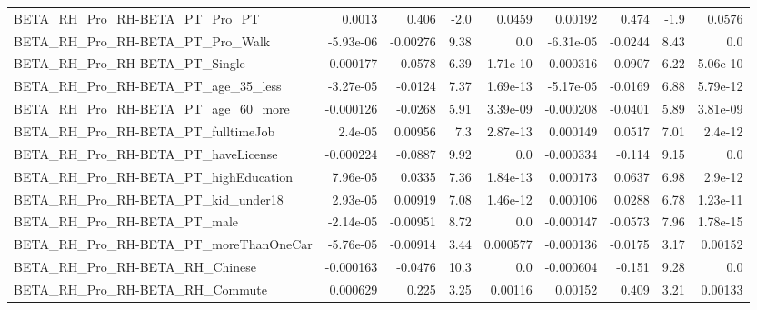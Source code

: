 \begin{tabular}{lrrrrrrrr}
BETA\_RH\_Pro\_RH-BETA\_PT\_Pro\_PT                      &      0.0013 &        0.406 &      -2.0 &   0.0459 &    0.00192 &       0.474 &         -1.9 &        0.0576 \\
BETA\_RH\_Pro\_RH-BETA\_PT\_Pro\_Walk                    &   -5.93e-06 &     -0.00276 &      9.38 &      0.0 &  -6.31e-05 &     -0.0244 &         8.43 &           0.0 \\
BETA\_RH\_Pro\_RH-BETA\_PT\_Single                      &    0.000177 &       0.0578 &      6.39 & 1.71e-10 &   0.000316 &      0.0907 &         6.22 &      5.06e-10 \\
BETA\_RH\_Pro\_RH-BETA\_PT\_age\_35\_less                 &   -3.27e-05 &      -0.0124 &      7.37 & 1.69e-13 &  -5.17e-05 &     -0.0169 &         6.88 &      5.79e-12 \\
BETA\_RH\_Pro\_RH-BETA\_PT\_age\_60\_more                 &   -0.000126 &      -0.0268 &      5.91 & 3.39e-09 &  -0.000208 &     -0.0401 &         5.89 &      3.81e-09 \\
BETA\_RH\_Pro\_RH-BETA\_PT\_fulltimeJob                 &     2.4e-05 &      0.00956 &       7.3 & 2.87e-13 &   0.000149 &      0.0517 &         7.01 &       2.4e-12 \\
BETA\_RH\_Pro\_RH-BETA\_PT\_haveLicense                 &   -0.000224 &      -0.0887 &      9.92 &      0.0 &  -0.000334 &      -0.114 &         9.15 &           0.0 \\
BETA\_RH\_Pro\_RH-BETA\_PT\_highEducation               &    7.96e-05 &       0.0335 &      7.36 & 1.84e-13 &   0.000173 &      0.0637 &         6.98 &       2.9e-12 \\
BETA\_RH\_Pro\_RH-BETA\_PT\_kid\_under18                 &    2.93e-05 &      0.00919 &      7.08 & 1.46e-12 &   0.000106 &      0.0288 &         6.78 &      1.23e-11 \\
BETA\_RH\_Pro\_RH-BETA\_PT\_male                        &   -2.14e-05 &     -0.00951 &      8.72 &      0.0 &  -0.000147 &     -0.0573 &         7.96 &      1.78e-15 \\
BETA\_RH\_Pro\_RH-BETA\_PT\_moreThanOneCar              &   -5.76e-05 &     -0.00914 &      3.44 & 0.000577 &  -0.000136 &     -0.0175 &         3.17 &       0.00152 \\
BETA\_RH\_Pro\_RH-BETA\_RH\_Chinese                     &   -0.000163 &      -0.0476 &      10.3 &      0.0 &  -0.000604 &      -0.151 &         9.28 &           0.0 \\
BETA\_RH\_Pro\_RH-BETA\_RH\_Commute                     &    0.000629 &        0.225 &      3.25 &  0.00116 &    0.00152 &       0.409 &         3.21 &       0.00133 \\

\end{tabular}
